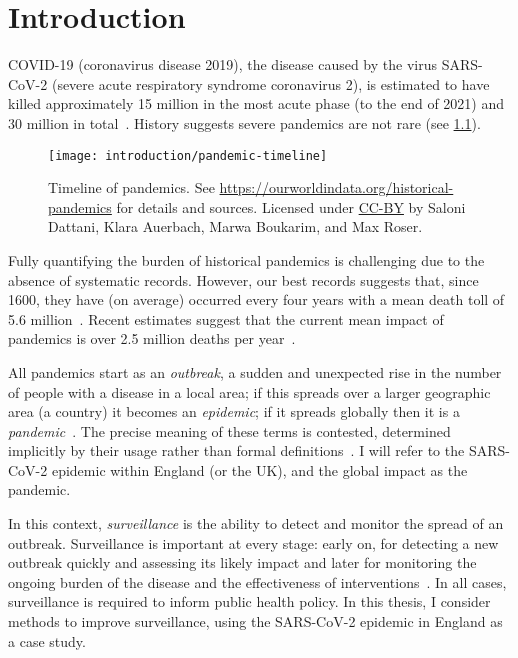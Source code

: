 \documentclass[thesis.tex]{subfiles}
\begin{document}
\chapter{Introduction} \label{intro}

COVID-19 (coronavirus disease 2019), the disease caused by the virus SARS-CoV-2 (severe acute respiratory syndrome coronavirus 2), is estimated to have killed approximately 15 million in the most acute phase (to the end of 2021) and 30 million in total~\autocite{whoCOVIDExcess,economistCOVIDExcess}.
History suggests severe pandemics are not rare (see \cref{intro:fig:pandemic-timeline}).
\begin{figure}
    \texttt{[image: introduction/pandemic-timeline]}
    \caption[Timeline of pandemics.]{%
        Timeline of pandemics.
        See \url{https://ourworldindata.org/historical-pandemics} for details and sources.
        Licensed under \href{https://creativecommons.org/licenses/by/4.0/}{CC-BY} by Saloni Dattani, Klara Auerbach, Marwa Boukarim, and Max Roser.
    }
    \label{intro:fig:pandemic-timeline}
\end{figure}
Fully quantifying the burden of historical pandemics is challenging due to the absence of systematic records.
However, our best records suggests that, since 1600, they have (on average) occurred every four years with a mean death toll of 5.6 million~\autocite{maraniNovelEpidemics}.
Recent estimates suggest that the current mean impact of pandemics is over 2.5 million deaths per year~\autocite{madhavPandemicMortality}.

All pandemics start as an \emph{outbreak}, a sudden and unexpected rise in the number of people with a disease in a local area; if this spreads over a larger geographic area (\eg a country) it becomes an \emph{epidemic}; if it spreads globally then it is a \emph{pandemic}~\autocite{grennanPandemic}.
The precise meaning of these terms is contested, determined implicitly by their usage rather than formal definitions~\autocite{morensPandemic,doshiElusive}.
I will refer to the SARS-CoV-2 epidemic within England (or the UK), and the global impact as the pandemic.

In this context, \emph{surveillance} is the ability to detect and monitor the spread of an outbreak.
Surveillance is important at every stage: early on, for detecting a new outbreak quickly and assessing its likely impact and later for monitoring the ongoing burden of the disease and the effectiveness of interventions~\autocite{whoFluSurveillance}.
In all cases, surveillance is required to inform public health policy.
In this thesis, I consider methods to improve surveillance, using the SARS-CoV-2 epidemic in England as a case study.
\end{document}
